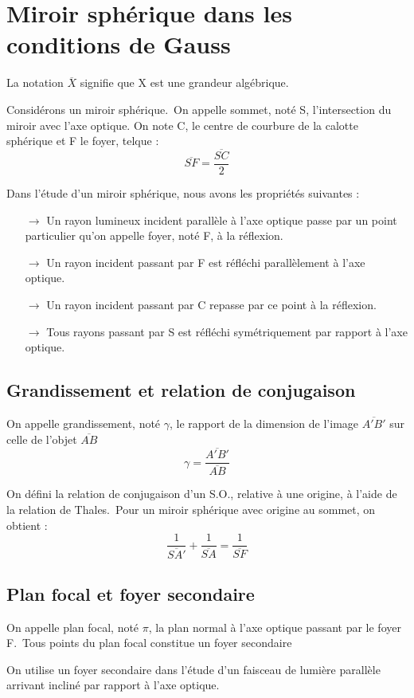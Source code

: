 \section{Miroir sphérique dans les conditions de Gauss}
La notation $\overline{X}$ signifie que X est une grandeur algébrique.
\begin{de}
Considérons un miroir sphérique.\
On appelle sommet, noté S, l'intersection du miroir avec l'axe optique. On note C, le centre de courbure de la calotte sphérique et F le foyer, telque :
$$\overline{SF} = \dfrac{\overline{SC}}{2}$$
\end{de}
Dans l'étude d'un miroir sphérique, nous avons les propriétés suivantes :
\begin{itemize}
 \item[$\rightarrow$] Un rayon lumineux incident parallèle à l'axe optique passe par un point particulier qu'on appelle foyer, noté F, à la réflexion.
 \item[$\rightarrow$] Un rayon incident passant par F est réfléchi parallèlement à l'axe optique.
 \item[$\rightarrow$] Un rayon incident passant par C repasse par ce point à la réflexion.
 \item[$\rightarrow$] Tous rayons passant par S est réfléchi symétriquement par rapport à l'axe optique.
\end{itemize}
\subsection{Grandissement et relation de conjugaison}
\begin{de}
On appelle grandissement, noté $\gamma$, le rapport de la dimension de l'image $\overline{A'B'}$ sur celle de l'objet $\overline{AB}$
$$\gamma = \dfrac{\overline{A'B'}}{\overline{AB}}$$
\end{de}
\begin{prop}
On défini la relation de conjugaison d'un S.O., relative à une origine, à l'aide de la relation de Thales.\
Pour un miroir sphérique avec origine au sommet, on obtient :
$$\dfrac{1}{\overline{SA'}} + \dfrac{1}{\overline{SA}} = \dfrac{1}{\overline{SF}}$$
\end{prop}
\subsection{Plan focal et foyer secondaire}
\begin{de}
On appelle plan focal, noté $\pi$, la plan normal à l'axe optique passant par le foyer F.\
Tous points du plan focal constitue un foyer secondaire 
\end{de}
On utilise un foyer secondaire dans l'étude d'un faisceau de lumière parallèle arrivant incliné par rapport à l'axe optique.
